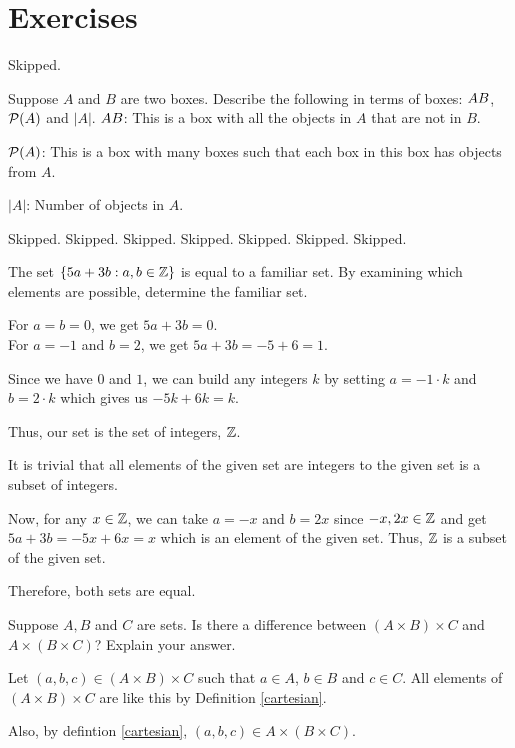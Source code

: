 \section*{Exercises}


\bp Skipped.\ep 

\bp 
	Suppose $A$ and $B$ are two boxes. Describe the following in terms of boxes: $A \\ B$, $\mathcal{P}(A)$ and $|A|$.
\ep 
\bs
	$A \\ B$: This is a box with all the objects in $A$ that are not in $B$.

	$\mathcal{P}(A)$: This is a box with many boxes such that each box in this box has objects from $A$.

	$|A|$: Number of objects in $A$.
\es


\bp Skipped.\ep 
\bp Skipped.\ep 
\bp Skipped.\ep 
\bp Skipped.\ep 
\bp Skipped.\ep 
\bp Skipped.\ep 
\bp Skipped.\ep 

\bp 
	The set $\{5a+3b: a, b \in \mathbb{Z}\}$ is equal to a familiar set. By examining which elements are possible, determine the familiar set.
\ep 

\bs
	For $a = b = 0$, we get $5a + 3b = 0$. \\
	For $a = -1$ and $b = 2$, we get $5a + 3b = -5+6 = 1$.

	Since we have $0$ and $1$, we can build any integers $k$ by setting $a = -1 \cdot k$ and $b = 2 \cdot k$ which gives us $-5k+6k = k$.

	Thus, our set is the set of integers, $\mathbb{Z}$.

	It is trivial that all elements of the given set are integers to the given set is a subset of integers.

	Now, for any $x \in \mathbb{Z}$, we can take $a = -x$ and $b = 2x$ since $-x, 2x \in \mathbb{Z}$ and get $5a + 3b = -5x + 6x = x$ which is an element of the given set.
	Thus, $\mathbb{Z}$ is a subset of the given set.

	Therefore, both sets are equal.

\es

\bp 
	Suppose $A, B$ and $C$ are sets. Is there a difference between $(A \times B) \times C$ and $A \times (B \times C)$? Explain your answer.
\ep 

\bs
	Let $(a, b, c) \in (A \times B) \times C$ such that $a \in A$, $b \in B$ and $c \in C$. All elements of $(A \times B) \times C$ are like this by Definition \ref{cartesian}.

	Also, by defintion \ref{cartesian}, $(a, b, c) \in A \times (B \times C)$.


